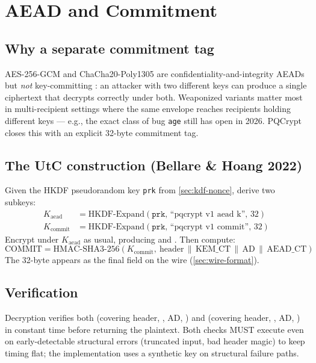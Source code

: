 \section{AEAD and Commitment}
\label{sec:aead-commitment}

\subsection{Why a separate commitment tag}

AES-256-GCM and ChaCha20-Poly1305 are confidentiality-and-integrity AEADs but \emph{not} key-committing \citep{grubbs2017aead}: an attacker with two different keys can produce a single ciphertext that decrypts correctly under both. Weaponized variants \citep{albertini2020aead,len2021aead} matter most in multi-recipient settings where the same envelope reaches recipients holding different keys --- e.g., the exact class of bug \texttt{age} still has open in 2026. PQCrypt closes this with an explicit 32-byte commitment tag.

\subsection{The UtC construction (Bellare \& Hoang 2022)}

Given the HKDF pseudorandom key \texttt{prk} from \cref{sec:kdf-nonce}, derive two subkeys:
\begin{align*}
K_{\mathrm{aead}}   &= \mathrm{HKDF\text{-}Expand}(\texttt{prk},\, \text{``pqcrypt v1 aead k''},\, 32) \\
K_{\mathrm{commit}} &= \mathrm{HKDF\text{-}Expand}(\texttt{prk},\, \text{``pqcrypt v1 commit''},\, 32)
\end{align*}
Encrypt under $K_{\mathrm{aead}}$ as usual, producing  and . Then compute:
$$
\mathrm{COMMIT} = \mathrm{HMAC\text{-}SHA3\text{-}256}\!\left(K_{\mathrm{commit}},\ \mathrm{header} \,\|\, \mathrm{KEM\_CT} \,\|\, \mathrm{AD} \,\|\, \mathrm{AEAD\_CT}\right)
$$
The 32-byte  appears as the final field on the wire (\cref{sec:wire-format}).

\subsection{Verification}

Decryption verifies both  (covering header, , AD, ) and  (covering header, , AD, ) in constant time before returning the plaintext. Both checks MUST execute even on early-detectable structural errors (truncated input, bad header magic) to keep timing flat; the implementation uses a synthetic key on structural failure paths.

